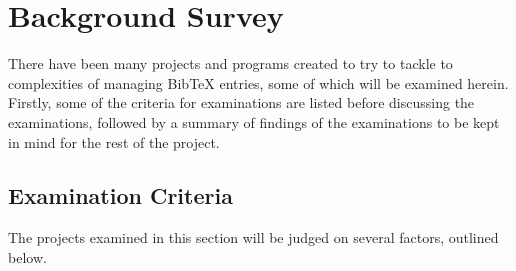 \documentclass{l4proj}
\newcommand{\BibTeX}{B{\sc ib}\TeX}
\newcommand{\bibtex}{\BibTeX}
\begin{document}

\chapter{Background Survey}
\label{backgrnd}
There have been many projects and programs created to try to tackle to complexities of managing \bibtex{} entries, some of which will be examined herein.  Firstly, some of the criteria for examinations are listed before discussing the examinations, followed by a summary of findings of the examinations to be kept in mind for the rest of the project.

\section{Examination Criteria}
The projects examined in this section will be judged on several factors, outlined below.
\end{document}
